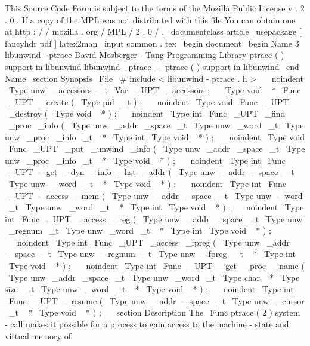 %
This
Source
Code
Form
is
subject
to
the
terms
of
the
Mozilla
Public
%
License
v
.
2
.
0
.
If
a
copy
of
the
MPL
was
not
distributed
with
this
%
file
You
can
obtain
one
at
http
:
/
/
mozilla
.
org
/
MPL
/
2
.
0
/
.
\
documentclass
{
article
}
\
usepackage
[
fancyhdr
pdf
]
{
latex2man
}
\
input
{
common
.
tex
}
\
begin
{
document
}
\
begin
{
Name
}
{
3
}
{
libunwind
-
ptrace
}
{
David
Mosberger
-
Tang
}
{
Programming
Library
}
{
ptrace
(
)
support
in
libunwind
}
libunwind
-
ptrace
-
-
ptrace
(
)
support
in
libunwind
\
end
{
Name
}
\
section
{
Synopsis
}
\
File
{
\
#
include
<
libunwind
-
ptrace
.
h
>
}
\
\
\
noindent
\
Type
{
unw
\
_accessors
\
_t
}
\
Var
{
\
_UPT
\
_accessors
}
;
\
\
\
Type
{
void
~
*
}
\
Func
{
\
_UPT
\
_create
}
(
\
Type
{
pid
\
_t
}
)
;
\
\
\
noindent
\
Type
{
void
}
\
Func
{
\
_UPT
\
_destroy
}
(
\
Type
{
void
~
*
}
)
;
\
\
\
noindent
\
Type
{
int
}
\
Func
{
\
_UPT
\
_find
\
_proc
\
_info
}
(
\
Type
{
unw
\
_addr
\
_space
\
_t
}
\
Type
{
unw
\
_word
\
_t
}
\
Type
{
unw
\
_proc
\
_info
\
_t
~
*
}
\
Type
{
int
}
\
Type
{
void
~
*
}
)
;
\
\
\
noindent
\
Type
{
void
}
\
Func
{
\
_UPT
\
_put
\
_unwind
\
_info
}
(
\
Type
{
unw
\
_addr
\
_space
\
_t
}
\
Type
{
unw
\
_proc
\
_info
\
_t
~
*
}
\
Type
{
void
~
*
}
)
;
\
\
\
noindent
\
Type
{
int
}
\
Func
{
\
_UPT
\
_get
\
_dyn
\
_info
\
_list
\
_addr
}
(
\
Type
{
unw
\
_addr
\
_space
\
_t
}
\
Type
{
unw
\
_word
\
_t
~
*
}
\
Type
{
void
~
*
}
)
;
\
\
\
noindent
\
Type
{
int
}
\
Func
{
\
_UPT
\
_access
\
_mem
}
(
\
Type
{
unw
\
_addr
\
_space
\
_t
}
\
Type
{
unw
\
_word
\
_t
}
\
Type
{
unw
\
_word
\
_t
~
*
}
\
Type
{
int
}
\
Type
{
void
~
*
}
)
;
\
\
\
noindent
\
Type
{
int
}
\
Func
{
\
_UPT
\
_access
\
_reg
}
(
\
Type
{
unw
\
_addr
\
_space
\
_t
}
\
Type
{
unw
\
_regnum
\
_t
}
\
Type
{
unw
\
_word
\
_t
~
*
}
\
Type
{
int
}
\
Type
{
void
~
*
}
)
;
\
\
\
noindent
\
Type
{
int
}
\
Func
{
\
_UPT
\
_access
\
_fpreg
}
(
\
Type
{
unw
\
_addr
\
_space
\
_t
}
\
Type
{
unw
\
_regnum
\
_t
}
\
Type
{
unw
\
_fpreg
\
_t
~
*
}
\
Type
{
int
}
\
Type
{
void
~
*
}
)
;
\
\
\
noindent
\
Type
{
int
}
\
Func
{
\
_UPT
\
_get
\
_proc
\
_name
}
(
\
Type
{
unw
\
_addr
\
_space
\
_t
}
\
Type
{
unw
\
_word
\
_t
}
\
Type
{
char
~
*
}
\
Type
{
size
\
_t
}
\
Type
{
unw
\
_word
\
_t
~
*
}
\
Type
{
void
~
*
}
)
;
\
\
\
noindent
\
Type
{
int
}
\
Func
{
\
_UPT
\
_resume
}
(
\
Type
{
unw
\
_addr
\
_space
\
_t
}
\
Type
{
unw
\
_cursor
\
_t
~
*
}
\
Type
{
void
~
*
}
)
;
\
\
\
section
{
Description
}
The
\
Func
{
ptrace
}
(
2
)
system
-
call
makes
it
possible
for
a
process
to
gain
access
to
the
machine
-
state
and
virtual
memory
of
\
